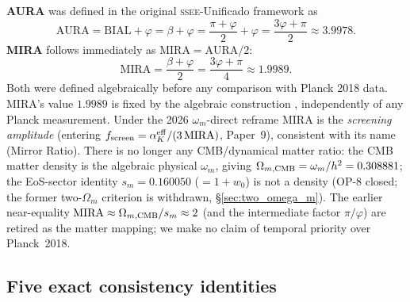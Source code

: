 \documentclass[12pt,a4paper]{article}
\newcommand{\SSEE}{\ifmmode\mathrm{SSEE}\else\textsc{ssee}\fi}
\begin{document}
\textbf{AURA} was defined in the original \SSEE-Unificado framework as
\[
  \mathrm{AURA} = \mathrm{BIAL} + \varphi = \beta + \varphi
  = \frac{\pi+\varphi}{2} + \varphi = \frac{3\varphi+\pi}{2} \approx 3.9978.
\]
\textbf{MIRA} follows immediately as $\mathrm{MIRA} = \mathrm{AURA}/2$:
\[
  \mathrm{MIRA} = \frac{\beta+\varphi}{2} = \frac{3\varphi+\pi}{4} \approx 1.9989.
\]
Both were defined algebraically before any comparison with Planck 2018 data.
MIRA's value $1.9989$ is fixed by the algebraic construction
\citep{AlmeidaSSEE2026genesis}, independently of any Planck measurement. Under
the 2026 $\omega_m$-direct reframe MIRA is the \emph{screening amplitude}
(entering $f_{\rm screen}=\alpha_K^{\rm eff}/(3\,\mathrm{MIRA})$, Paper~9), consistent with
its name (Mirror Ratio). There is no longer any CMB/dynamical matter ratio: the
CMB matter density is the algebraic physical $\omega_m$, giving
$\Omega_{m,\rm CMB}=\omega_m/h^2=0.308881$; the EoS-sector identity
$s_m=0.160050$ ($=1+w_0$) is not a density (OP-8 closed; the former
two-$\Omega_m$ criterion is withdrawn, \S\ref{sec:two_omega_m}).
The earlier near-equality
$\mathrm{MIRA}\approx\Omega_{m,\rm CMB}/s_m\approx2$ (and the
intermediate factor $\pi/\varphi$) are retired as the matter mapping; we make no
claim of temporal priority over Planck~2018.

\subsection*{Five exact consistency identities}
\end{document}
